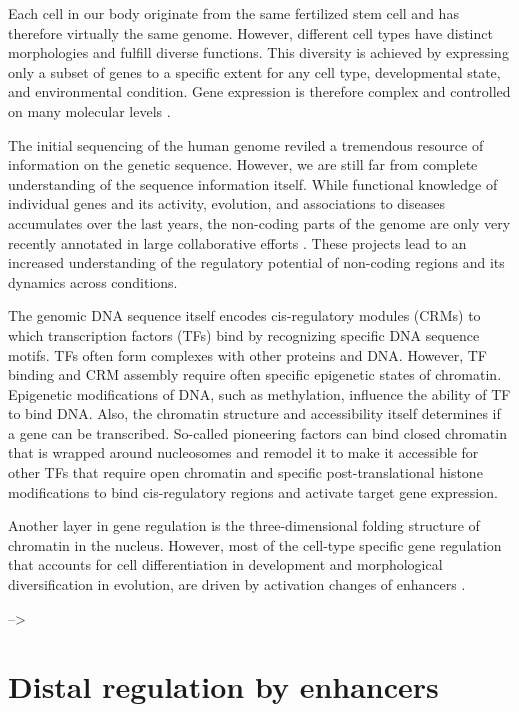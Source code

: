 \documentclass[a4paper,twoside=true,openright,parskip=full,chapterprefix=true,11pt,headings=normal,bibliography=totoc,listof=totoc,titlepage=on,captions=tableabove,draft=false]{scrreprt}
\theoremstyle{definition}
\theoremstyle{definition}
\theoremstyle{definition}
\theoremstyle{remark}
\begin{document}
Each cell in our body originate from the same fertilized stem cell and
has therefore virtually the same genome. However, different cell types
have distinct morphologies and fulfill diverse functions. This diversity
is achieved by expressing only a subset of genes to a specific extent
for any cell type, developmental state, and environmental condition.
Gene expression is therefore complex and controlled on many molecular
levels \citep{Lelli2012}.

The initial sequencing of the human genome reviled a tremendous resource
of information on the genetic sequence. However, we are still far from
complete understanding of the sequence information itself. While
functional knowledge of individual genes and its activity, evolution,
and associations to diseases accumulates over the last years, the
non-coding parts of the genome are only very recently annotated in large
collaborative efforts \citep{Dunham2012, Kundaje2015, Andersson2014}.
These projects lead to an increased understanding of the regulatory
potential of non-coding regions and its dynamics across conditions.

The genomic DNA sequence itself encodes cis-regulatory modules (CRMs) to
which transcription factors (TFs) bind by recognizing specific DNA
sequence motifs. TFs often form complexes with other proteins and DNA.
However, TF binding and CRM assembly require often specific epigenetic
states of chromatin. Epigenetic modifications of DNA, such as
methylation, influence the ability of TF to bind DNA. Also, the
chromatin structure and accessibility itself determines if a gene can be
transcribed. So-called pioneering factors can bind closed chromatin that
is wrapped around nucleosomes and remodel it to make it accessible for
other TFs that require open chromatin and specific post-translational
histone modifications to bind cis-regulatory regions and activate target
gene expression.

Another layer in gene regulation is the three-dimensional folding
structure of chromatin in the nucleus. However, most of the cell-type
specific gene regulation that accounts for cell differentiation in
development and morphological diversification in evolution, are driven
by activation changes of enhancers \citep{Long2016}.

--\textgreater{}

\hypertarget{distal-regulation-by-enhancers}{%
\section{Distal regulation by
enhancers}\label{distal-regulation-by-enhancers}}
\end{document}
